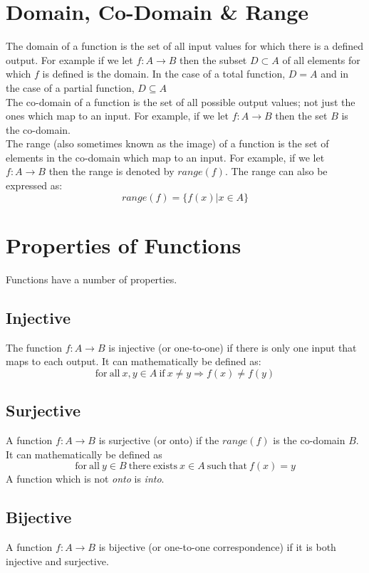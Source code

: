 \section{Domain, Co-Domain \& Range}
The domain of a function is the set of all input values for which there is a defined output. For example if we let $f: A \rightarrow B$ then the subset $D \subset A$ of all elements for which $f$ is defined is the domain. In the case of a total function, $D = A$ and in the case of a partial function, $ D \subseteq A$\\

The co-domain of a function is the set of all possible output values; not just the ones which map to an input. For example, if we let $f: A \rightarrow B$ then the set $B$ is the co-domain. \\

The range (also sometimes known as the image) of a function is the set of elements in the co-domain which map to an input. For example, if we let $f: A \rightarrow B$ then the range is denoted by $range(f)$. The range can also be expressed as:
\[range(f) = \{f (x) | x \in A\}\]

\section{Properties of Functions}
Functions have a number of properties. 
\subsection{Injective}
The function $f: A \rightarrow B$ is injective (or one-to-one) if there is only one input that maps to each output. It can mathematically be defined as:
\[\mathrm{for\ all\ } x,y \in A \mathrm{\ if \ } x \neq y \Rightarrow f(x) \neq f(y)\]

\subsection{Surjective}
A function $f: A \rightarrow B$ is surjective (or onto) if the $range(f)$ is the co-domain $B$. It can mathematically be defined as
\[\mathrm{for\ all\ } y \in B \mathrm{\ there\ exists\ } x \in A \mathrm{\ such\ that\ } f(x) = y \]
A function which is not \textit{onto} is \textit{into}.

\subsection{Bijective}
A function $f: A \rightarrow B$ is bijective (or one-to-one correspondence) if it is both injective and surjective.

